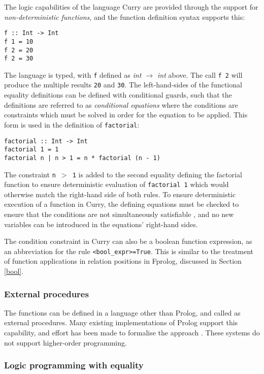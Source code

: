 \documentclass[a4paper,11pt,twoside]{article}
\begin{document}
The logic capabilities of the language Curry \cite{HAK+97} are provided
through the support for \textit{non-deterministic functions}, and the
function definition syntax supports this:
\begin{verbatim}
f :: Int -> Int
f 1 = 10
f 2 = 20
f 2 = 30
\end{verbatim}
The language is typed, with \texttt{f} defined as
\textit{int $\rightarrow$ int} above.  The call \texttt{f 2} will
produce the multiple results \texttt{20} and \texttt{30}.
The left-hand-sides of the functional equality definitions can be
defined with conditional guards, such that the definitions are
referred to as \textit{conditional equations} where the conditions are
constraints which must be solved in order for the equation to be applied.
This form is used in the definition of \texttt{factorial}:
\begin{verbatim}
factorial :: Int -> Int
factorial 1 = 1
factorial n | n > 1 = n * factorial (n - 1)
\end{verbatim}
The constraint \texttt{n $>$ 1} is added to the second equality defining
the factorial function to ensure deterministic evaluation of 
\texttt{factorial 1} which would otherwise match the right-hand side of both rules.
To ensure deterministic execution of a function in Curry, the defining
equations
must be checked to ensure that the conditions are not simultaneously
satisfiable \cite{MNRA92}, and no new variables can be introduced
in the equations' right-hand sides.

The condition constraint in Curry can also be a boolean function
expression, as an abbreviation for the rule \texttt{<bool\_{}expr>=True}.
This is similar to the treatment of function applications
in relation positions in Fprolog, discussed in Section \ref{bool}.

\subsubsection{External procedures}

The functions can be defined in a language other than Prolog, and
called as external procedures.  Many existing implementations of Prolog
support this capability, and effort has been made to formalise the
approach \cite{BM88, MBB+93, Bon92}.  These systems do not support 
higher-order programming.

\subsubsection{Logic programming with equality}
\end{document}
